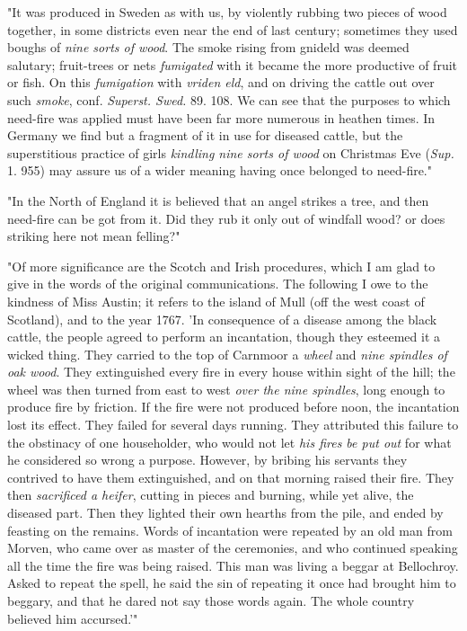 \documentclass[a4paper, 11pt, oneside, polutonikogreek, english]{article}
\begin{document}
"It was produced in Sweden as with us, by violently rubbing two pieces of wood together, in some districts even near the end of last century; sometimes they used boughs of \emph{nine sorts of wood}. The smoke rising from gnideld was deemed salutary; fruit-trees or nets \emph{fumigated} with it became the more productive of fruit or fish. On this \emph{fumigation} with \emph{vriden eld}, and on driving the cattle out over such \emph{smoke}, conf. \emph{Superst. Swed.} 89. 108. We can see that the purposes to which need-fire was applied must have been far more numerous in heathen times. In Germany we find but a fragment of it in use for diseased cattle, but the superstitious practice of girls \emph{kindling nine sorts of wood} on Christmas Eve (\emph{Sup.} 1. 955) may assure us of a wider meaning having once belonged to need-fire."

"In the North of England it is believed that an angel strikes a tree, and then need-fire can be got from it. Did they rub it only out of windfall wood? or does striking here not mean felling?"

"Of more significance are the Scotch and Irish procedures, which I am glad to give in the words of the original communications. The following I owe to the kindness of Miss Austin; it refers to the island of Mull (off the west coast of Scotland), and to the year 1767. 'In consequence of a disease among the black cattle, the people agreed to perform an incantation, though they esteemed it a wicked thing. They carried to the top of Carnmoor a \emph{wheel} and \emph{nine spindles of oak wood}. They extinguished every fire in every house within sight of the hill; the wheel was then turned from east to west \emph{over the nine spindles}, long enough to produce fire by friction. If the fire were not produced before noon, the incantation lost its effect. They failed for several days running. They attributed this failure to the obstinacy of one householder, who would not let \emph{his fires be put out} for what he considered so wrong a purpose. However, by bribing his servants they contrived to have them extinguished, and on that morning raised their fire. They then \emph{sacrificed a heifer}, cutting in pieces and burning, while yet alive, the diseased part. Then they lighted their own hearths from the pile, and ended by feasting on the remains. Words of incantation were repeated by an old man from Morven, who came over as master of the ceremonies, and who continued speaking all the time the fire was being raised. This man was living a beggar at Bellochroy. Asked to repeat the spell, he said the sin of repeating it once had brought him to beggary, and that he dared not say those words again. The whole country believed him accursed.'"
\end{document}
